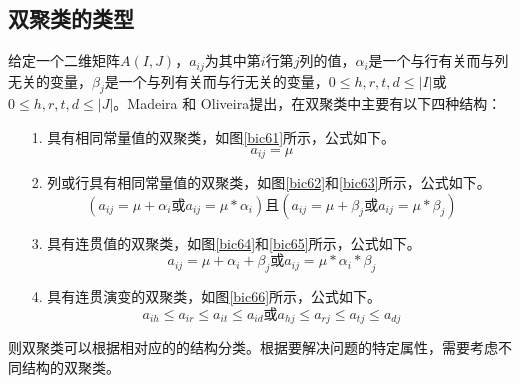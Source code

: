  \subsection{双聚类的类型}
    给定一个二维矩阵$A(I,J)$，$a_{ij}$为其中第$i$行第$j$列的值，$\alpha_i$是一个与行有关而与列无关的变量，$\beta_j$是一个与列有关而与行无关的变量，$0\le h,r,t,d \le |I|$或$0\le h,r,t,d \le |J|$。Madeira 和 Oliveira提出，在双聚类中主要有以下四种结构：
    \begin{enumerate}
        \item[1.] 具有相同常量值的双聚类，如图\ref{bic61}所示，公式如下。
        \begin{equation}
         a_{ij}=\mu
        \end{equation}

        \item[2.] 列或行具有相同常量值的双聚类，如图\ref{bic62}和\ref{bic63}所示，公式如下。 
        \begin{equation}
        (a_{ij}=\mu+\alpha_i \mbox{或} a_{ij}=\mu *\alpha_i)  
        \mbox{且}
        (a_{ij}=\mu+\beta_j \mbox{或} a_{ij}=\mu *\beta_j)
        \end{equation}
        
        \item[3.] 具有连贯值的双聚类，如图\ref{bic64}和\ref{bic65}所示，公式如下。
        \begin{equation}
        a_{ij}=\mu+\alpha_i+\beta_j \mbox{或} a_{ij}=\mu *\alpha_i*\beta_j
        \end{equation} 

        \item[4.] 具有连贯演变的双聚类，如图\ref{bic66}所示，公式如下。
        \begin{equation}
        a_{ih}\le a_{ir}\le a_{it}\le a_{id} \mbox{或} a_{hj}\le a_{rj}\le a_{tj}\le  a_{dj} 
        \end{equation}
    \end{enumerate}
    则双聚类可以根据相对应的的结构分类。根据要解决问题的特定属性，需要考虑不同结构的双聚类。

